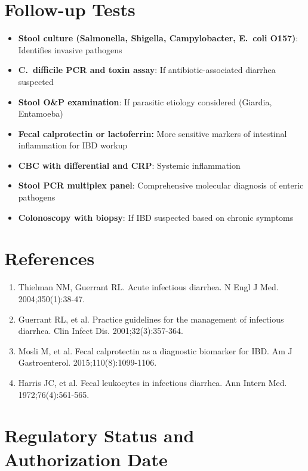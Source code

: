 \section*{Follow-up Tests}
\begin{itemize}
  \item \textbf{Stool culture (Salmonella, Shigella, Campylobacter, E.\ coli O157)}: Identifies invasive pathogens
  \item \textbf{C.\ difficile PCR and toxin assay}: If antibiotic-associated diarrhea suspected
  \item \textbf{ Stool O\&P examination}: If parasitic etiology considered (Giardia, Entamoeba)
  \item \textbf{Fecal calprotectin or lactoferrin:} More sensitive markers of intestinal inflammation for IBD workup
  \item \textbf{CBC with differential and CRP}: Systemic inflammation
  \item \textbf{Stool PCR multiplex panel}: Comprehensive molecular diagnosis of enteric pathogens
  \item \textbf{Colonoscopy with biopsy}: If IBD suspected based on chronic symptoms
\end{itemize}

\section*{References}
\begin{enumerate}
  \item Thielman NM, Guerrant RL. Acute infectious diarrhea. N Engl J Med. 2004;350(1):38-47.
  \item Guerrant RL, et al. Practice guidelines for the management of infectious diarrhea. Clin Infect Dis. 2001;32(3):357-364.
  \item Mosli M, et al. Fecal calprotectin as a diagnostic biomarker for IBD. Am J Gastroenterol. 2015;110(8):1099-1106.
  \item Harris JC, et al. Fecal leukocytes in infectious diarrhea. Ann Intern Med. 1972;76(4):561-565.
\end{enumerate}

\clearpage
\section*{Regulatory Status and Authorization Date}

\clearpage

